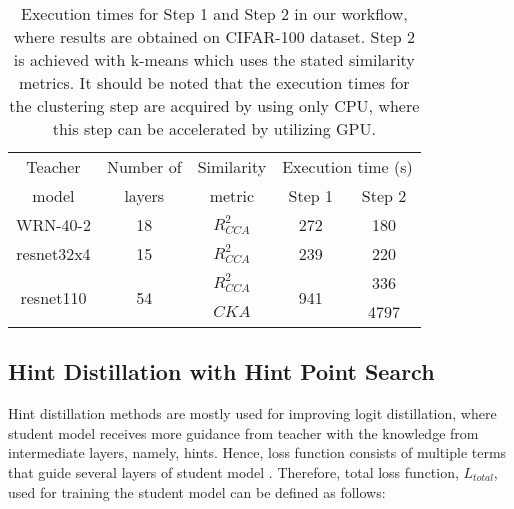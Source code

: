 \documentclass[final,3p,times]{elsarticle}
\begin{document}
\begin{table}[h]
\centering
\caption{{Execution times for Step 1 and Step 2 in our workflow, where results are obtained on CIFAR-100 dataset. Step 2 is achieved with k-means which uses the stated similarity metrics. It should be noted that the execution times for the clustering step are acquired by using only CPU, where this step can be accelerated by utilizing GPU.
\\}}
\label{tab:exec_time}

\begin{tabular}{c|c|c|c|c}

{Teacher} & {Number of } & {Similarity} & \multicolumn{2}{c}{Execution time (s)} \\ \cline{4-5}
model & layers & metric & Step 1 & Step 2 \\ \hline\hline

WRN-40-2 & 18 & $R^2_{CCA}$ & 272 & 180 \\ \hline
resnet32x4 & 15 & $R^2_{CCA}$ & 239 & 220 \\ \hline

\multirow{2}{*}{resnet110} & \multirow{2}{*}{54} & $R^2_{CCA}$ & \multirow{2}{*}{941} & 336 \\
&&$CKA$ & & 4797 \\
\hline
\end{tabular}
\end{table}


\subsection{Hint Distillation with Hint Point Search}



Hint distillation methods are mostly used for improving logit distillation, where student model receives more guidance from teacher with the knowledge from intermediate layers, namely, hints. Hence, loss function consists of multiple terms that guide several layers of student model \citep{peng2019correlation, yang2022multi}. Therefore, total loss function, $L_{total}$, used for training the student model can be defined as follows:
\end{document}
